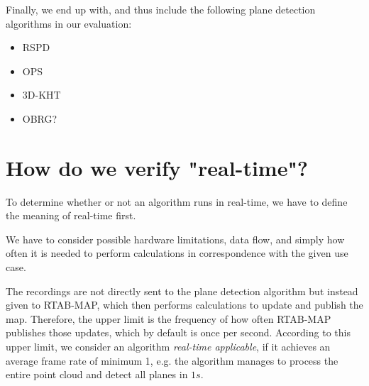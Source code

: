 \documentclass[main.tex]{subfiles}
\begin{document}
Finally, we end up with, and thus include the following plane detection algorithms in our evaluation:

\begin{itemize}
    \item RSPD
    \item OPS
    \item 3D-KHT
    \item OBRG?
\end{itemize}


\section{How do we verify "real-time"?}
To determine whether or not an algorithm runs in real-time, we have to define the meaning of real-time first.

We have to consider possible hardware limitations, data flow, and simply
how often it is needed to perform calculations in correspondence with the given use case.

The recordings are not directly sent to the plane detection algorithm but instead given to RTAB-MAP, which then performs calculations to update and publish the map.
Therefore, the upper limit is the frequency of how often RTAB-MAP publishes those updates, which by default is once per second.
According to this upper limit, we consider an algorithm \textit{real-time applicable}, if it achieves an average frame
rate of minimum 1, e.g. the algorithm manages to process the entire point cloud and detect all planes in $1s$.

\end{document}
